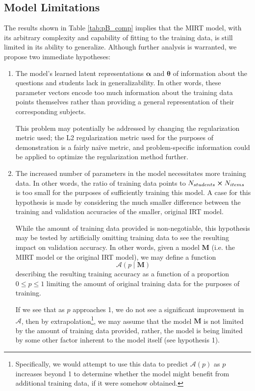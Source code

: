 \documentclass[10pt]{article}
\renewcommand{\bf}[1]{\mathbf{#1}}
\begin{document}
\subsection*{Model Limitations}

The results shown in Table \ref{tab:pB_comp} implies that the MIRT model, with its arbitrary complexity and capability of fitting to the training data, is still limited in its ability to generalize. Although further analysis is warranted, we propose two immediate hypotheses:

\begin{enumerate}
    \item The model's learned latent representations $\bm \alpha$ and $\bm \theta$ of information about the questions and students lack in generalizability. In other words, these parameter vectors encode too much information about the training data points themselves rather than providing a general representation of their corresponding subjects.

    \spacer
    
    This problem may potentially be addressed by changing the regularization metric used; the L2 regularization metric used for the purposes of demonstration is a fairly naïve metric, and problem-specific information could be applied to optimize the regularization method further.
    \item The increased number of parameters in the model necessitates more training data. In other words, the ratio of training data points to $N_{students}\cross N_{items}$ is too small for the purposes of sufficiently training this model. A case for this hypothesis is made by considering the much smaller difference between the training and validation accuracies of the smaller, original IRT model.

    \spacer

    While the amount of training data provided is non-negotiable, this hypothesis may be tested by artificially omitting training data to see the resulting impact on validation accuracy. In other words, given a model $\bf M$ (i.e. the MIRT model or the original IRT model), we may define a function
    $$
        \mathcal A(p\mid \bf M)
    $$
    describing the resulting training accuracy as a function of a proportion $0\leq p\leq 1$ limiting the amount of original training data for the purposes of training.
    
    \spacer
    
    If we see that as $p$ approaches 1, we do not see a significant improvement in $\mathcal A$, then by extrapolation\footnote{Specifically, we would attempt to use this data to predict $\mathcal A(p)$ as $p$ increases beyond 1 to determine whether the model might benefit from additional training data, if it were somehow obtained.}, we may assume that the model $\bf M$ is not limited by the amount of training data provided, rather, the model is being limited by some other factor inherent to the model itself (see hypothesis 1). 
\end{enumerate}
\end{document}
